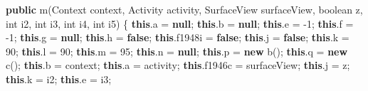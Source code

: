 \documentclass[
]{article}
\newenvironment{Shaded}{}{}
\newcommand{\BuiltInTok}[1]{\textcolor[rgb]{0.00,0.50,0.00}{#1}}
\newcommand{\DataTypeTok}[1]{\textcolor[rgb]{0.56,0.13,0.00}{#1}}
\newcommand{\DecValTok}[1]{\textcolor[rgb]{0.25,0.63,0.44}{#1}}
\newcommand{\FunctionTok}[1]{\textcolor[rgb]{0.02,0.16,0.49}{#1}}
\newcommand{\KeywordTok}[1]{\textcolor[rgb]{0.00,0.44,0.13}{\textbf{#1}}}
\newcommand{\NormalTok}[1]{#1}
\newcommand{\OperatorTok}[1]{\textcolor[rgb]{0.40,0.40,0.40}{#1}}
\begin{document}
\begin{Shaded}
\begin{Highlighting}[]
    \KeywordTok{public} \FunctionTok{m}\OperatorTok{(}\BuiltInTok{Context}\NormalTok{ context}\OperatorTok{,}\NormalTok{ Activity activity}\OperatorTok{,}\NormalTok{ SurfaceView surfaceView}\OperatorTok{,} \DataTypeTok{boolean}\NormalTok{ z}\OperatorTok{,} \DataTypeTok{int}\NormalTok{ i2}\OperatorTok{,} \DataTypeTok{int}\NormalTok{ i3}\OperatorTok{,} \DataTypeTok{int}\NormalTok{ i4}\OperatorTok{,} \DataTypeTok{int}\NormalTok{ i5}\OperatorTok{)} \OperatorTok{\{}
        \KeywordTok{this}\OperatorTok{.}\FunctionTok{a} \OperatorTok{=} \KeywordTok{null}\OperatorTok{;}
        \KeywordTok{this}\OperatorTok{.}\FunctionTok{b} \OperatorTok{=} \KeywordTok{null}\OperatorTok{;}
        \KeywordTok{this}\OperatorTok{.}\FunctionTok{e} \OperatorTok{=} \OperatorTok{{-}}\DecValTok{1}\OperatorTok{;}
        \KeywordTok{this}\OperatorTok{.}\FunctionTok{f} \OperatorTok{=} \OperatorTok{{-}}\DecValTok{1}\OperatorTok{;}
        \KeywordTok{this}\OperatorTok{.}\FunctionTok{g} \OperatorTok{=} \KeywordTok{null}\OperatorTok{;}
        \KeywordTok{this}\OperatorTok{.}\FunctionTok{h} \OperatorTok{=} \KeywordTok{false}\OperatorTok{;}
        \KeywordTok{this}\OperatorTok{.}\FunctionTok{f1948i} \OperatorTok{=} \KeywordTok{false}\OperatorTok{;}
        \KeywordTok{this}\OperatorTok{.}\FunctionTok{j} \OperatorTok{=} \KeywordTok{false}\OperatorTok{;}
        \KeywordTok{this}\OperatorTok{.}\FunctionTok{k} \OperatorTok{=} \DecValTok{90}\OperatorTok{;}
        \KeywordTok{this}\OperatorTok{.}\FunctionTok{l} \OperatorTok{=} \DecValTok{90}\OperatorTok{;}
        \KeywordTok{this}\OperatorTok{.}\FunctionTok{m} \OperatorTok{=} \DecValTok{95}\OperatorTok{;}
        \KeywordTok{this}\OperatorTok{.}\FunctionTok{n} \OperatorTok{=} \KeywordTok{null}\OperatorTok{;}
        \KeywordTok{this}\OperatorTok{.}\FunctionTok{p} \OperatorTok{=} \KeywordTok{new} \FunctionTok{b}\OperatorTok{();}
        \KeywordTok{this}\OperatorTok{.}\FunctionTok{q} \OperatorTok{=} \KeywordTok{new} \FunctionTok{c}\OperatorTok{();}
        \KeywordTok{this}\OperatorTok{.}\FunctionTok{b} \OperatorTok{=}\NormalTok{ context}\OperatorTok{;}
        \KeywordTok{this}\OperatorTok{.}\FunctionTok{a} \OperatorTok{=}\NormalTok{ activity}\OperatorTok{;}
        \KeywordTok{this}\OperatorTok{.}\FunctionTok{f1946c} \OperatorTok{=}\NormalTok{ surfaceView}\OperatorTok{;}
        \KeywordTok{this}\OperatorTok{.}\FunctionTok{j} \OperatorTok{=}\NormalTok{ z}\OperatorTok{;}
        \KeywordTok{this}\OperatorTok{.}\FunctionTok{k} \OperatorTok{=}\NormalTok{ i2}\OperatorTok{;}
        \KeywordTok{this}\OperatorTok{.}\FunctionTok{e} \OperatorTok{=}\NormalTok{ i3}\OperatorTok{;}

\end{Highlighting}
\end{Shaded}
\end{document}
